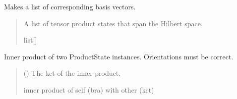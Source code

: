 \documentclass[letterpaper,10pt,english]{sphinxmanual}
\begin{document}
\begin{fulllineitems}

\begin{fulllineitems}
\label{\detokenize{spinbox:spinbox.core.ProductState.generate_basis_states}}
\pysigstartsignatures
{}
\pysigstopsignatures
\sphinxAtStartPar
Makes a list of corresponding basis vectors.
\begin{quote}\begin{description}
\sphinxAtStartPar
A list of tensor product states that span the Hilbert space.

\sphinxAtStartPar
list{[}{\hyperref[\detokenize{spinbox:spinbox.core.ProductState}]{}}{]}

\end{description}\end{quote}

\end{fulllineitems}


\begin{fulllineitems}
\label{\detokenize{spinbox:spinbox.core.ProductState.inner}}
\pysigstartsignatures
{}
\pysigstopsignatures
\sphinxAtStartPar
Inner product of two ProductState instances. Orientations must be correct.
\begin{quote}\begin{description}
\sphinxAtStartPar
{} ({\hyperref[\detokenize{spinbox:spinbox.core.ProductState}]{}}) \textendash{} The ket of the inner product.

\sphinxAtStartPar
inner product of self (bra) with other (ket)


\end{description}
\end{quote}
\end{fulllineitems}
\end{fulllineitems}
\end{document}
